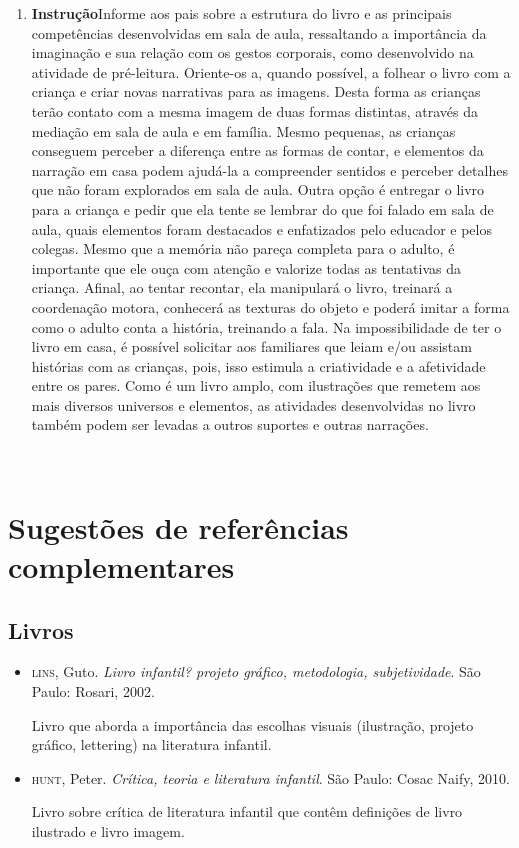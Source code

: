 \documentclass[11pt]{extarticle}
\begin{document}
\begin{enumerate}
\item \textbf{Instrução}\quad Informe aos pais sobre a estrutura do livro e as principais competências desenvolvidas em sala de aula, ressaltando a importância da imaginação e sua relação com os gestos corporais, como desenvolvido na atividade de pré-leitura.
Oriente-os a, quando possível, a folhear o livro com a criança e criar novas narrativas para as imagens.
Desta forma as crianças terão contato com a mesma imagem de duas formas distintas, através da mediação em sala de aula e em família. 
Mesmo pequenas, as crianças conseguem perceber a diferença entre 
as formas de contar, e elementos da narração em casa podem ajudá-la a compreender 
sentidos e perceber detalhes que não foram explorados em sala de aula.
Outra opção é entregar o livro para a criança e pedir que ela tente se lembrar
do que foi falado em sala de aula, quais elementos foram destacados e enfatizados pelo educador e pelos colegas. Mesmo que a memória não pareça 
completa para o adulto, é importante que ele ouça com atenção e 
valorize todas as tentativas da criança. Afinal, ao tentar recontar, 
ela manipulará o livro, treinará a coordenação motora, conhecerá as texturas 
do objeto e poderá imitar a forma como o adulto 
conta a história, treinando a fala. 
Na impossibilidade de ter o livro em casa, é possível solicitar aos familiares que leiam e/ou assistam histórias com as crianças, pois, isso estimula a criatividade e a afetividade entre os pares. Como é um livro amplo, com ilustrações que remetem aos mais diversos universos e elementos, as atividades desenvolvidas no livro também podem ser levadas a outros suportes e outras narrações. 
\end{enumerate}

 
\section{Sugestões de referências complementares}

\subsection{Livros} 

\begin{itemize}
\item \textsc{lins}, Guto. \textit{Livro infantil? projeto gráfico, metodologia, subjetividade}. São Paulo: Rosari, 2002.

Livro que aborda a importância das escolhas visuais (ilustração, projeto gráfico, lettering) na literatura infantil.  

\item \textsc{hunt}, Peter. \textit{Crítica, teoria e literatura infantil}. São Paulo: Cosac Naify, 2010.

Livro sobre crítica de literatura infantil que contêm definições de livro ilustrado e livro imagem. 
\end{itemize}
\end{document}
